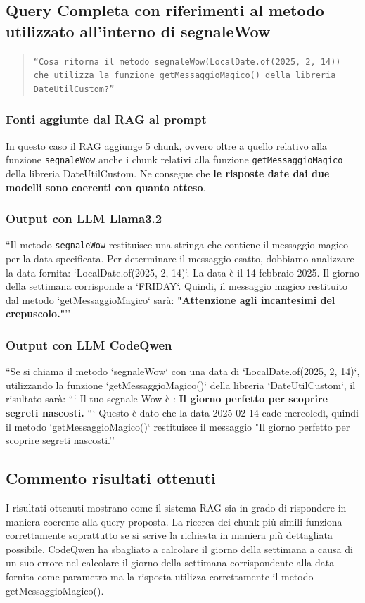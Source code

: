 \documentclass[12pt,a4paper,openright,twoside]{book}
\begin{document}
\subsection{Query Completa con riferimenti al metodo utilizzato all'interno di segnaleWow}
\begin{quote}
    \texttt{``Cosa ritorna il metodo segnaleWow(LocalDate.of(2025, 2, 14)) che utilizza la funzione getMessaggioMagico() della libreria DateUtilCustom?''}
\end{quote}
\subsubsection{Fonti aggiunte dal RAG al prompt}
In questo caso il RAG aggiunge 5 chunk, ovvero oltre a quello relativo alla funzione \texttt{segnaleWow} anche i chunk relativi alla funzione \texttt{getMessaggioMagico} della libreria DateUtilCustom.
Ne consegue che \textbf{le risposte date dai due modelli sono coerenti con quanto atteso}.
\subsubsection{Output con LLM Llama3.2}
``Il metodo \texttt{segnaleWow} restituisce una stringa che contiene il messaggio magico per la data specificata. 
Per determinare il messaggio esatto, dobbiamo analizzare la data fornita: `LocalDate.of(2025, 2, 14)`.
La data è il 14 febbraio 2025. Il giorno della settimana corrisponde a `FRIDAY`.
Quindi, il messaggio magico restituito dal metodo `getMessaggioMagico` sarà:
\textbf{"Attenzione agli incantesimi del crepuscolo."}''
\subsubsection{Output con LLM CodeQwen}
``Se si chiama il metodo `segnaleWow` con una data di `LocalDate.of(2025, 2, 14)`, utilizzando la funzione `getMessaggioMagico()` della libreria `DateUtilCustom`, il risultato sarà:
```
Il tuo segnale Wow è : \textbf{Il giorno perfetto per scoprire segreti nascosti.}
```
Questo è dato che la data 2025-02-14 cade mercoledì, quindi il metodo `getMessaggioMagico()` restituisce il messaggio "Il giorno perfetto per scoprire segreti nascosti.''
\subsection{Commento risultati ottenuti}
I risultati ottenuti mostrano come il sistema RAG sia in grado di rispondere in maniera coerente alla query proposta.
La ricerca dei chunk più simili funziona correttamente soprattutto se si scrive la richiesta in maniera più dettagliata possibile.
CodeQwen ha sbagliato a calcolare il giorno della settimana a causa di un suo errore nel calcolare il giorno della settimana corrispondente alla data fornita come parametro ma la risposta utilizza correttamente il metodo getMessaggioMagico().
\end{document}

